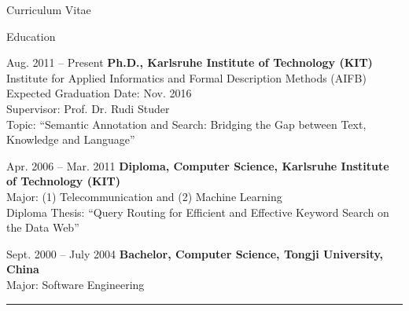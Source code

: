 \begin{cv}{\centerline{\LARGE Curriculum Vitae}}
  \begin{cvlist}{Education}
  \item[Aug. 2011 -- Present] \textbf{Ph.D., Karlsruhe Institute of Technology (KIT)}\\
    Institute for Applied Informatics and Formal Description Methods (AIFB) \\
    Expected Graduation Date: Nov. 2016 \\
    Supervisor: Prof. Dr. Rudi Studer\\
    Topic: ``Semantic Annotation and Search: Bridging the Gap between Text, Knowledge and Language''\\
  \item[Apr. 2006 -- Mar. 2011] \textbf{Diploma, Computer Science, Karlsruhe Institute of Technology (KIT)}\\
    Major: (1) Telecommunication and
	(2) Machine Learning \\
    Diploma Thesis: ``Query Routing for Efficient and Effective Keyword Search on the Data Web''
  \item[Sept. 2000 -- July 2004] \textbf{Bachelor, Computer Science, 
      Tongji University, China}\\
    Major: Software Engineering\\
  \end{cvlist}

  \hrule


\end{cv}
